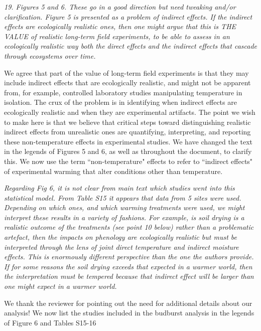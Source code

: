\documentclass[11pt,a4paper]{letter}
\begin{document}
\begin{letter}{}
\emph{19. Figures 5 and 6. These go in a good direction but need tweaking and/or clarification. Figure 5 is presented as a
problem of indirect effects. If the indirect effects are ecologically realistic ones, then one might
argue that this is THE VALUE of realistic long-term field experiments, to be able to assess in an
ecologically realistic way both the direct effects and the indirect effects that cascade through
ecosystems over time.}

We agree that part of the value of long-term field experiments is that they may include indirect effects that are ecologically realistic, and might not be apparent from, for example, controlled laboratory studies manipulating temperature in isolation. The crux of the problem is in identifying when indirect effects are ecologically realistic and when they are experimental artifacts. The point we wish to make here is that we believe that critical steps toward distinguishing realistic indirect effects from unrealistic ones are quantifying, interpreting, and reporting these non-temperature effects in experimental studies. We have changed the text in the legends of Figures 5 and 6, as well as throughout the document, to clarify this. We now use the term ``non-temperature" effects to refer to ``indirect effects" of experimental warming that alter conditions other than temperature. 

\emph{Regarding Fig 6, it is not clear from main text which studies went into this statistical model. From Table S15 it appears that data from 5 sites were used. Depending on which ones, and which warming treatments were used, we might interpret these results in a variety of fashions. For example, is soil drying is a realistic outcome of the treatments (see point 10 below) rather than a problematic artefact, then the impacts on phenology are ecologically realistic but must be interpreted through the lens of joint direct temperature and indirect moisture effects. This is enormously different perspective than the one the authors provide. If for some reasons the soil drying exceeds that expected in a warmer world, then the interpretation must be tempered because that indirect effect will be larger than one might expect in a warmer world.}

\par We thank the reviewer for pointing out the need for additional details about our analysis! We now list the studies included in the budburst analysis in the legends of Figure 6 and Tables S15-16


\end{letter}
\end{document}
